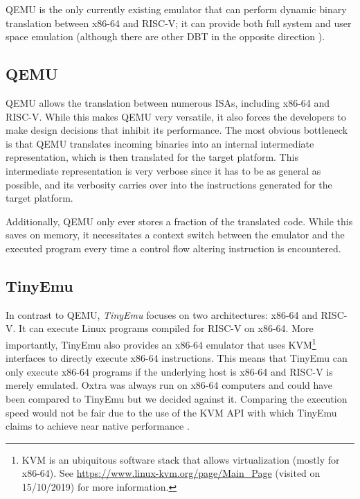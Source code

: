 QEMU \cite{qemu} is the only currently existing emulator that can perform dynamic binary translation between x86-64 and RISC-V; it can provide both full system and user space emulation (although there are other DBT in the opposite direction \cite{rv8}).

\subsection{QEMU}
	QEMU allows the translation between numerous ISAs, including x86-64 and RISC-V. While this makes QEMU very versatile, it also forces the developers to make design decisions that inhibit its performance. The most obvious bottleneck is that QEMU translates incoming binaries into an internal intermediate representation, which is then translated for the target platform. This intermediate representation is very verbose since it has to be as general as possible, and its verbosity carries over into the instructions generated for the target platform.
	
	Additionally, QEMU only ever stores a fraction of the translated code. While this saves on memory, it necessitates a context switch between the emulator and the executed program every time a control flow altering instruction is encountered.

\subsection{TinyEmu}
	In contrast to QEMU, \emph{TinyEmu} focuses on two architectures: x86-64 and RISC-V. It can execute Linux programs compiled for RISC-V on x86-64. More importantly, TinyEmu also provides an x86-64 emulator that uses KVM\footnote{KVM is an ubiquitous software stack that allows virtualization (mostly for x86-64). See \url{https://www.linux-kvm.org/page/Main_Page} (visited on 15/10/2019) for more information.} interfaces to directly execute x86-64 instructions. This means that TinyEmu can only execute x86-64 programs if the underlying host is x86-64 and RISC-V is merely emulated. Oxtra was always run on x86-64 computers and could have been compared to TinyEmu but we decided against it. Comparing the execution speed would not be fair due to the use of the KVM API with which TinyEmu claims to achieve near native performance \cite{tinyemu}.


